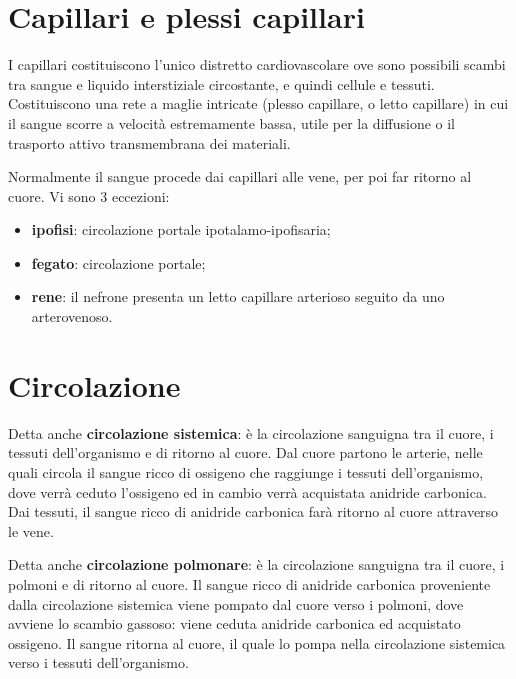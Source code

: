 \section{Capillari e plessi capillari}

I capillari costituiscono l'unico distretto cardiovascolare ove sono possibili scambi tra sangue
e liquido interstiziale circostante, e quindi cellule e tessuti. Costituiscono una rete a maglie
intricate (plesso capillare, o letto capillare) in cui il sangue scorre a velocità estremamente
bassa, utile per la diffusione o il trasporto attivo transmembrana dei materiali.

Normalmente il sangue procede dai capillari alle vene, per poi far ritorno al cuore. Vi sono 3
eccezioni:
\begin{itemize}
  \item \textbf{ipofisi}: circolazione portale ipotalamo-ipofisaria;
  \item \textbf{fegato}: circolazione portale;
  \item \textbf{rene}: il nefrone presenta un letto capillare arterioso seguito da uno
    arterovenoso.
\end{itemize}

\section{Circolazione}

Detta anche \textbf{circolazione sistemica}: è la circolazione sanguigna tra il cuore, i tessuti
dell'organismo e di ritorno al cuore. Dal cuore partono le arterie, nelle quali circola il sangue
ricco di ossigeno che raggiunge i tessuti dell'organismo, dove verrà ceduto l'ossigeno ed in
cambio verrà acquistata anidride carbonica. Dai tessuti, il sangue ricco di anidride carbonica
farà ritorno al cuore attraverso le vene.

Detta anche \textbf{circolazione polmonare}: è la circolazione sanguigna tra il cuore, i polmoni e
di ritorno al cuore. Il sangue ricco di anidride carbonica proveniente dalla circolazione
sistemica viene pompato dal cuore verso i polmoni, dove avviene lo scambio gassoso: viene ceduta
anidride carbonica ed acquistato ossigeno. Il sangue ritorna al cuore, il quale lo pompa nella
circolazione sistemica verso i tessuti dell'organismo.

